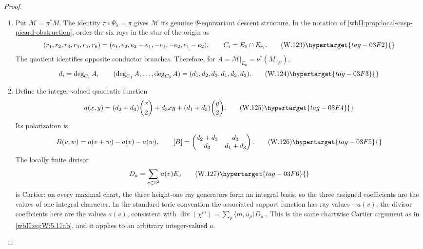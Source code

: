 \begin{proof}

\begin{enumerate}[label={$\langle1\rangle$\arabic*.},leftmargin=*]
\item Put \(\mathcal M=\pi^*M\).  The identity
\(\pi\circ\Psi_\lambda=\pi\) gives \(\mathcal M\) its genuine
\(\Psi\)-equivariant descent structure.  In the notation of
\cref{wbII:prop:local-cusp-picard-obstruction}, order the six rays in the star
of the origin as
\[
 (r_1,r_2,r_3,r_4,r_5,r_6)
 =(e_1,e_2,e_2-e_1,-e_1,-e_2,e_1-e_2),
 \qquad C_i=E_0\cap E_{r_i}.
\tag{W.123}\hypertarget{tag-03F2}{}\label{wbII:eq:W:5.17-A23}
\]
The quotient identifies opposite conductor branches.  Therefore, for
\(A=\mathcal M|_{E_0}=\nu^*(M|_W)\),
\[
 d_i=\deg_{C_i}A,
 \qquad
 (\deg_{C_1}A,\ldots,\deg_{C_6}A)
 =(d_1,d_2,d_3,d_1,d_2,d_3).
\tag{W.124}\hypertarget{tag-03F3}{}\label{wbII:eq:W:5.17-A24}
\]

\item Define the integer-valued quadratic function
\[
 a(x,y)
 =(d_2+d_3)\binom{x}{2}+d_3xy+(d_1+d_3)\binom{y}{2}.
\tag{W.125}\hypertarget{tag-03F4}{}\label{wbII:eq:W:5.17-A25}
\]
Its polarization is
\[
 B(v,w)=a(v+w)-a(v)-a(w),
 \qquad
 [B]=
 \begin{pmatrix}
  d_2+d_3&d_3\\ d_3&d_1+d_3
 \end{pmatrix}.
\tag{W.126}\hypertarget{tag-03F5}{}\label{wbII:eq:W:5.17-A26}
\]
The locally finite divisor
\[
 D_a=\sum_{v\in\mathbb Z^2}a(v)E_v
\tag{W.127}\hypertarget{tag-03F6}{}\label{wbII:eq:W:5.17-A27}
\]
is Cartier: on every maximal chart, the three height-one ray generators
form an integral basis, so the three assigned coefficients are the values
of one integral character.  In the standard toric convention the associated
support function has ray values \(-a(v)\); the divisor coefficients here are
the values \(a(v)\), consistent with
\(\operatorname{div}(\chi^m)=\sum_\rho\langle m,u_\rho\rangle D_\rho\)
\cite[Propositions~4.1.1--4.1.2, p.~171; Theorems~4.2.8,
p.~181 and~4.2.12, p.~184]{CoxLittleSchenck2011}.
This is the same chartwise Cartier argument as
in \eqref{wbII:eq:W:5.17ab}, and it applies to an arbitrary integer-valued \(a\).


\end{enumerate}
\end{proof}
